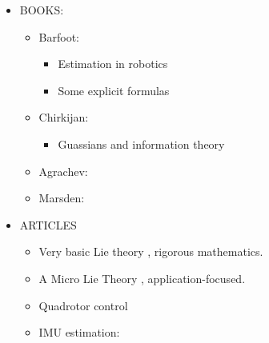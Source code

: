 \begin{itemize}
  \item BOOKS:
        \begin{itemize}
          \item Barfoot: \cite{barfoot_state_2017}
                \begin{itemize}
                  \item Estimation in robotics
                  \item Some explicit formulas
                \end{itemize}
          \item Chirkijan: \cite{chirikjian_stochastic_2012, chirikjian_stochastic_2009}
                \begin{itemize}
                  \item Guassians and information theory
                \end{itemize}
          \item Agrachev: \cite{agrachev_control_2004}
          \item Marsden: \cite{marsden_introduction_1998}
        \end{itemize}

  \item ARTICLES
        \begin{itemize}
          \item Very basic Lie theory \cite{howe_very_1983}, rigorous mathematics.
          \item A Micro Lie Theory \cite{sola_micro_2018}, application-focused.
          \item Quadrotor control \cite{Lee2015}
          \item IMU estimation: \cite{hua_implementation_2014, mahony_nonlinear_2008}
        \end{itemize}
\end{itemize}
